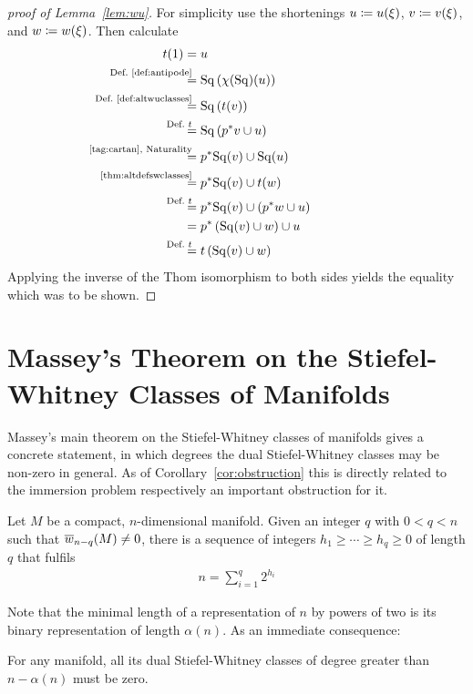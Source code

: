\begin{proof}[proof of Lemma~\ref{lem:wu}]
  For simplicity use the shortenings
  $u\coloneqq {u}(\xi)$,
  $v\coloneqq {v}(\xi)$, and
  $w\coloneqq {w}(\xi)$.
  Then calculate
  \begin{align*}
    \thomiso(1)
    &= \U
    \\
    &\equalsby{Def.~\ref{def:antipode}}
      \SQ\left(\antipode(\SQ)(\U)\right)
    \\
    &\equalsby{Def.~\ref{def:altwuclasses}}
      \SQ\left(\thomiso(\Vu)\right)
    \\
    &\equalsby{Def.~$\thomiso$}
      \SQ\left(\pb p\Vu \cup \U\right)
    \\
    &\equalsby{\ref{tag:cartan}, Naturality}
      \pb p\SQ(\Vu) \cup \SQ(\U)
    \\
    &\equalsby{\ref{thm:altdefswclasses}}
      \pb p\SQ(\Vu) \cup \thomiso(\Ws)
    \\
    &\equalsby{Def.~$\thomiso$}
      \pb p\SQ(\Vu) \cup \left(\pb p \Ws \cup \U\right)
    \\
    &=
      \pb p\left(\SQ(\Vu) \cup \Ws\right) \cup \U
    \\
    &\equalsby{Def.~$\thomiso$}
      \thomiso\left(\SQ(\Vu) \cup \Ws\right)
  \end{align*}
  Applying the inverse of the Thom isomorphism to both sides
  yields the equality which was to be shown.
\end{proof}


\section{Massey's Theorem on the Stiefel-Whitney Classes of Manifolds}
\label{sec:massey}
Massey's main theorem on the Stiefel-Whitney classes of manifolds
\cite[Theorem~I.]{massey} gives a concrete statement, in which degrees
the dual Stiefel-Whitney classes may be non-zero in general.
As of Corollary~\ref{cor:obstruction} this is directly related to the
immersion problem respectively an important obstruction for it.
\begin{Thm}[Massey]\label{thm:massey}  
  Let $M$ be a compact, $n$-dimensional manifold.
  Given an integer $q$ with $0<q<n$ such that ${\overline{w}_{n-q}}(M)\neq0$,
  there is a sequence of integers $h_1\geq\dotsb\geq h_q\geq0$ of
  length $q$ that fulfils
  \begin{gather*}
    n = \sum_{i=1}^{q} 2^{h_i}
  \end{gather*}
\end{Thm}
Note that the minimal length of a representation of $n$ by
powers of two is its binary representation of length $\alpha(n)$.
As an immediate consequence:
\begin{Cor}
  For any manifold, all its dual Stiefel-Whitney classes of degree
  greater than $n-\alpha(n)$ must be zero.
\end{Cor}

